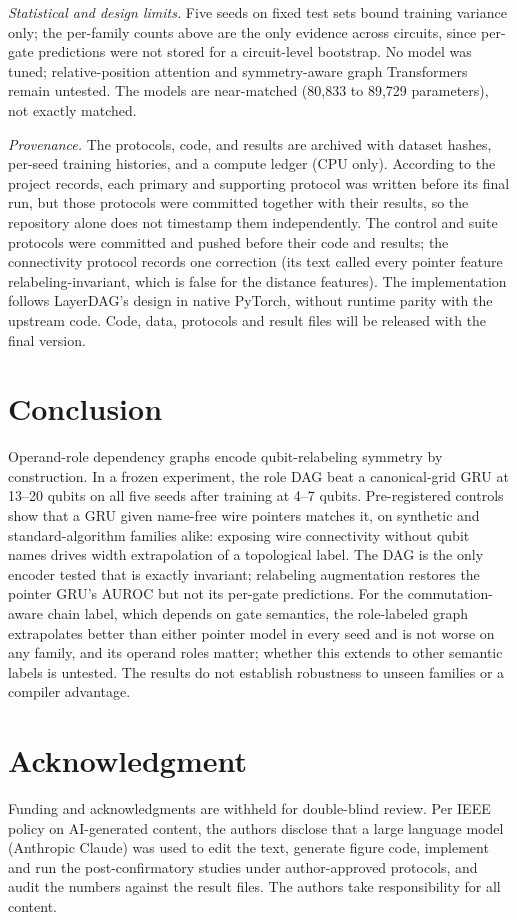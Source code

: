 \documentclass[conference,a4paper]{IEEEtran}
\begin{document}
\emph{Statistical and design limits.} Five seeds on fixed test sets bound training variance only; the per-family counts above are the only evidence across circuits, since per-gate predictions were not stored for a circuit-level bootstrap. No model was tuned; relative-position attention and symmetry-aware graph Transformers remain untested. The models are near-matched (80,833 to 89,729 parameters), not exactly matched.

\emph{Provenance.} The protocols, code, and results are archived with dataset hashes, per-seed training histories, and a compute ledger (CPU only). According to the project records, each primary and supporting protocol was written before its final run, but those protocols were committed together with their results, so the repository alone does not timestamp them independently. The control and suite protocols were committed and pushed before their code and results; the connectivity protocol records one correction (its text called every pointer feature relabeling-invariant, which is false for the distance features). The implementation follows LayerDAG's design in native PyTorch, without runtime parity with the upstream code. Code, data, protocols and result files will be released with the final version.

\section{Conclusion}
Operand-role dependency graphs encode qubit-relabeling symmetry by construction. In a frozen experiment, the role DAG beat a canonical-grid GRU at 13--20 qubits on all five seeds after training at 4--7 qubits. Pre-registered controls show that a GRU given name-free wire pointers matches it, on synthetic and standard-algorithm families alike: exposing wire connectivity without qubit names drives width extrapolation of a topological label. The DAG is the only encoder tested that is exactly invariant; relabeling augmentation restores the pointer GRU's AUROC but not its per-gate predictions. For the commutation-aware chain label, which depends on gate semantics, the role-labeled graph extrapolates better than either pointer model in every seed and is not worse on any family, and its operand roles matter; whether this extends to other semantic labels is untested. The results do not establish robustness to unseen families or a compiler advantage.

\section*{Acknowledgment}
Funding and acknowledgments are withheld for double-blind review. Per IEEE policy on AI-generated content, the authors disclose that a large language model (Anthropic Claude) was used to edit the text, generate figure code, implement and run the post-confirmatory studies under author-approved protocols, and audit the numbers against the result files. The authors take responsibility for all content.



\end{document}
